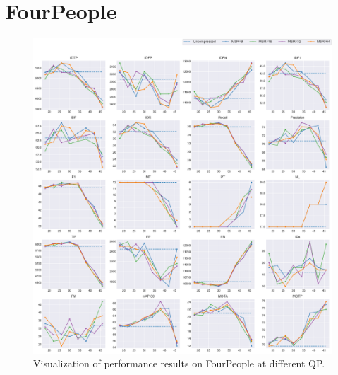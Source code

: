 
\section{FourPeople}
\label{sec:appendix/FourPeople_all}


\begin{figure}[!htbp]
\centering
\includegraphics[width=1.0\linewidth]{img/appendix/FourPeople_all_multiplots_qp.pdf}
\caption[Visualization of performance results on FourPeople at different QP]
{Visualization of performance results on FourPeople at different QP.}
\label{fig:FourPeople_all_qp}
\end{figure}

